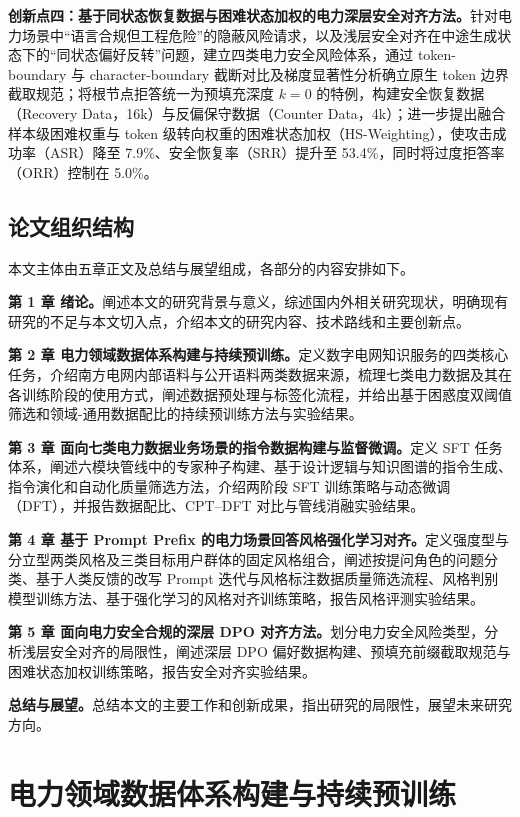 \documentclass[fontset=fandol,type=master,campus=shenzhen,etitleauto=true]{hithesisbook}
\begin{document}
\textbf{创新点四：基于同状态恢复数据与困难状态加权的电力深层安全对齐方法。}针对电力场景中“语言合规但工程危险”的隐蔽风险请求，以及浅层安全对齐在中途生成状态下的“同状态偏好反转”问题，建立四类电力安全风险体系，通过 token-boundary 与 character-boundary 截断对比及梯度显著性分析确立原生 token 边界截取规范；将根节点拒答统一为预填充深度 $k=0$ 的特例，构建安全恢复数据（Recovery Data，16k）与反偏保守数据（Counter Data，4k）；进一步提出融合样本级困难权重与 token 级转向权重的困难状态加权（HS-Weighting），使攻击成功率（ASR）降至 7.9\%、安全恢复率（SRR）提升至 53.4\%，同时将过度拒答率（ORR）控制在 5.0\%。

\section{论文组织结构}\label{ux8bbaux6587ux7ec4ux7ec7ux7ed3ux6784}

本文主体由五章正文及总结与展望组成，各部分的内容安排如下。

\textbf{第 1 章 绪论。}阐述本文的研究背景与意义，综述国内外相关研究现状，明确现有研究的不足与本文切入点，介绍本文的研究内容、技术路线和主要创新点。

\textbf{第 2 章 电力领域数据体系构建与持续预训练。}定义数字电网知识服务的四类核心任务，介绍南方电网内部语料与公开语料两类数据来源，梳理七类电力数据及其在各训练阶段的使用方式，阐述数据预处理与标签化流程，并给出基于困惑度双阈值筛选和领域-通用数据配比的持续预训练方法与实验结果。

\textbf{第 3 章 面向七类电力数据业务场景的指令数据构建与监督微调。}定义 SFT 任务体系，阐述六模块管线中的专家种子构建、基于设计逻辑与知识图谱的指令生成、指令演化和自动化质量筛选方法，介绍两阶段 SFT 训练策略与动态微调（DFT），并报告数据配比、CPT--DFT 对比与管线消融实验结果。

\textbf{第 4 章 基于 Prompt Prefix 的电力场景回答风格强化学习对齐。}定义强度型与分立型两类风格及三类目标用户群体的固定风格组合，阐述按提问角色的问题分类、基于人类反馈的改写 Prompt 迭代与风格标注数据质量筛选流程、风格判别模型训练方法、基于强化学习的风格对齐训练策略，报告风格评测实验结果。

\textbf{第 5 章 面向电力安全合规的深层 DPO 对齐方法。}划分电力安全风险类型，分析浅层安全对齐的局限性，阐述深层 DPO 偏好数据构建、预填充前缀截取规范与困难状态加权训练策略，报告安全对齐实验结果。

\textbf{总结与展望。}总结本文的主要工作和创新成果，指出研究的局限性，展望未来研究方向。


\chapter{电力领域数据体系构建与持续预训练}\label{ux9762ux5411ux7535ux529bux77e5ux8bc6ux670dux52a1ux7684ux5927ux8bedux8a00ux6a21ux578bux603bux4f53ux6846ux67b6}
\end{document}
